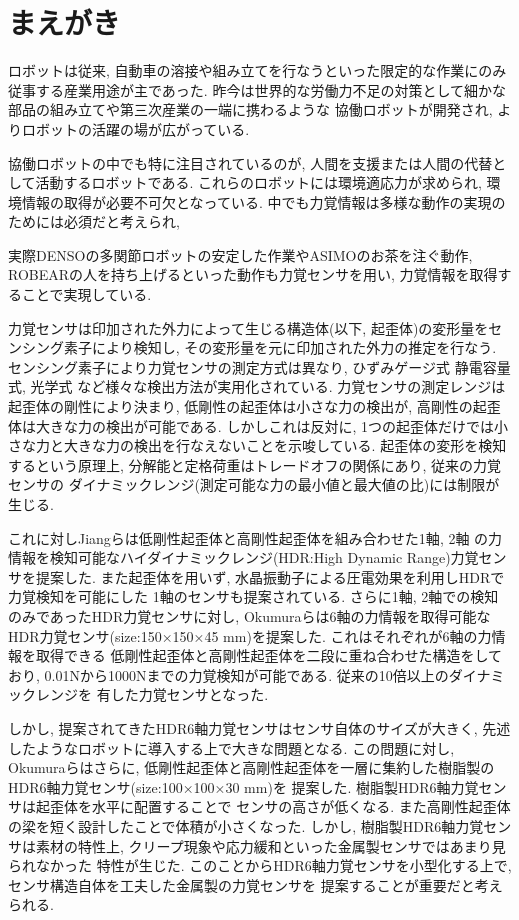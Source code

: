 \section{まえがき} 
ロボットは従来, 自動車の溶接や組み立てを行なうといった限定的な作業にのみ従事する産業用途が主であった.
昨今は世界的な労働力不足の対策として細かな部品の組み立てや第三次産業の一端に携わるような
協働ロボットが開発され, よりロボットの活躍の場が広がっている.

協働ロボットの中でも特に注目されているのが, 
人間を支援または人間の代替として活動するロボットである. 
これらのロボットには環境適応力が求められ, 環境情報の取得が必要不可欠となっている.
中でも力覚情報は多様な動作の実現のためには必須だと考えられ, 

実際DENSOの多関節ロボット\cite{denso}の安定した作業やASIMO\cite{asimo}のお茶を注ぐ動作, 
ROBEAR\cite{ROBEAR}の人を持ち上げるといった動作も力覚センサを用い, 
力覚情報を取得することで実現している.

力覚センサは印加された外力によって生じる構造体(以下, 起歪体)の変形量をセンシング素子により検知し,
その変形量を元に印加された外力の推定を行なう. 
センシング素子により力覚センサの測定方式は異なり, 
ひずみゲージ式\cite{yoshikawa1989six}%
静電容量式\cite{Beyeler2009}, 
光学式\cite{Kim2013a}%
など様々な検出方法が実用化されている. 
力覚センサの測定レンジは起歪体の剛性により決まり, 
低剛性の起歪体は小さな力の検出が, 高剛性の起歪体は大きな力の検出が可能である. 
しかしこれは反対に, 1つの起歪体だけでは小さな力と大きな力の検出を行なえないことを示唆している. 
起歪体の変形を検知するという原理上, 分解能と定格荷重はトレードオフの関係にあり, 従来の力覚センサの
ダイナミックレンジ(測定可能な力の最小値と最大値の比)には制限が生じる. 

これに対しJiangらは低剛性起歪体と高剛性起歪体を組み合わせた1軸\cite{Jiang2015}, 2軸\cite{jiang2013}
の力情報を検知可能なハイダイナミックレンジ(HDR:High Dynamic Range)力覚センサを提案した. 
また起歪体を用いず, 水晶振動子による圧電効果を利用しHDRで力覚検知を可能にした
1軸のセンサも提案されている\cite{murozaki2014miniaturized}. 
さらに1軸, 2軸での検知のみであったHDR力覚センサに対し, Okumuraらは6軸の力情報を取得可能な
HDR力覚センサ(size:150×150×45 mm)を提案した\cite{okumura2018high}. これはそれぞれが6軸の力情報を取得できる
低剛性起歪体と高剛性起歪体を二段に重ね合わせた構造をしており, 
0.01Nから1000Nまでの力覚検知が可能である. 従来の10倍以上のダイナミックレンジを
有した力覚センサとなった. 

しかし, 提案されてきたHDR6軸力覚センサはセンサ自体のサイズが大きく, 
先述したようなロボットに導入する上で大きな問題となる.
この問題に対し, Okumuraらはさらに, 低剛性起歪体と高剛性起歪体を一層に集約した樹脂製のHDR6軸力覚センサ(size:100×100×30 mm)を
提案した\cite{Okumura}. 樹脂製HDR6軸力覚センサは起歪体を水平に配置することで 
センサの高さが低くなる. また高剛性起歪体の梁を短く設計したことで体積が小さくなった. 
しかし, 樹脂製HDR6軸力覚センサは素材の特性上, クリープ現象や応力緩和といった金属製センサではあまり見られなかった
特性が生じた. このことからHDR6軸力覚センサを小型化する上で, センサ構造自体を工夫した金属製の力覚センサを
提案することが重要だと考えられる. 

